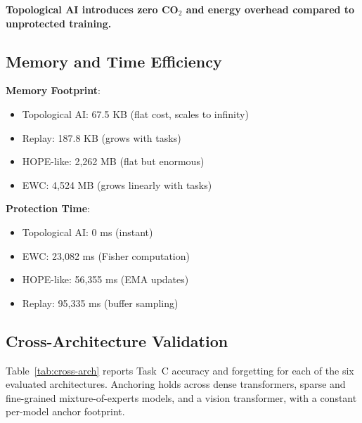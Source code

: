\documentclass{article}
\begin{document}
\textbf{Topological AI introduces zero CO$_2$ and energy overhead compared to unprotected training.}

\subsection{Memory and Time Efficiency}

\textbf{Memory Footprint}:
\begin{itemize}
\item Topological AI: 67.5 KB (flat cost, scales to infinity)
\item Replay: 187.8 KB (grows with tasks)
\item HOPE-like: 2,262 MB (flat but enormous)
\item EWC: 4,524 MB (grows linearly with tasks)
\end{itemize}

\textbf{Protection Time}:
\begin{itemize}
\item Topological AI: 0 ms (instant)
\item EWC: 23,082 ms (Fisher computation)
\item HOPE-like: 56,355 ms (EMA updates)
\item Replay: 95,335 ms (buffer sampling)
\end{itemize}

\subsection{Cross-Architecture Validation}

Table~\ref{tab:cross-arch} reports Task~C accuracy and forgetting for each of the six evaluated architectures. Anchoring holds across dense transformers, sparse and fine-grained mixture-of-experts models, and a vision transformer, with a constant per-model anchor footprint.

\begin{table}[H]
\centering
\caption{Cross-Architecture Validation Results}
\label{tab:cross-arch}
\end{table}
\end{document}
